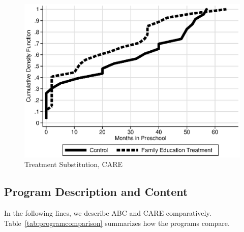\begin{figure}[H]
		\caption{Treatment Substitution, CARE} \label{fig:treatsubcare}
		\includegraphics[width=.9\columnwidth]{output/care_controlcontamination_months.eps}
\end{figure}
 


\subsection{Program Description and Content}

\noindent In the following lines, we describe ABC and CARE comparatively. Table~\ref{tab:programcomparison} summarizes how the programs compare.\\




